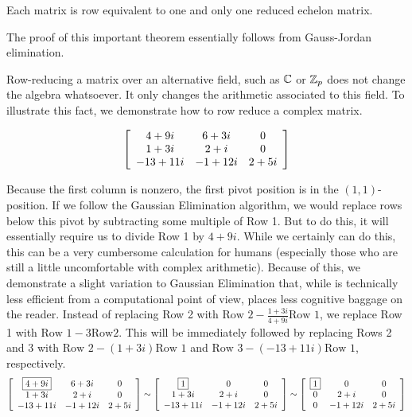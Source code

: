 \begin{Thm} Each matrix is row equivalent to one and only one reduced echelon matrix.
\end{Thm}\vs

The proof of this important theorem essentially follows from Gauss-Jordan elimination.

\begin{Exam} \begin{multicols}{2} %
Row-reducing a matrix over an alternative field, such as $\C$ or $\Z_p$ does not change the algebra whatsoever. It only changes the arithmetic associated to this field. To illustrate this fact, we demonstrate how to row reduce a complex matrix.

\[\mtx{ccc}{4+9i & 6+3i & 0 \\ 1+3i & 2+i & 0\\ -13+11i & -1+12i & 2+5i}\]
\end{multicols}

Because the first column is nonzero, the first pivot position is in the $(1,1)$-position. If we follow the Gaussian Elimination algorithm, we would replace rows below this pivot by subtracting some multiple of Row 1. But to do this, it will essentially require us to divide Row 1 by $4+9i$. While we certainly can do this, this can be a very cumbersome calculation for humans (especially those who are still a little uncomfortable with complex arithmetic). Because of this, we demonstrate a slight variation to Gaussian Elimination that, while is technically less efficient from a computational point of view, places less cognitive baggage on the reader. Instead of replacing Row 2 with $\text{Row 2} - \frac{1+3i}{4+9i}\text{Row 1}$, we replace Row 1 with $\text{Row 1} - 3\text{Row} 2$. This will be immediately followed by replacing Rows 2 and 3 with $\text{Row 2} - (1+3i)\text{Row 1}$ and $\text{Row 3} - (-13+11i)\text{Row 1}$, respectively.
\[\mtx{ccc}{\fbox{$4+9i$} & 6+3i & 0 \\ 1+3i & 2+i & 0\\ -13+11i & -1+12i & 2+5i} \sim \mtx{ccc}{\fbox{$1$} & 0 & 0 \\ 1+3i & 2+i & 0\\ -13+11i & -1+12i & 2+5i} \sim \mtx{ccc}{\fbox{$1$} & 0 & 0 \\ 0 & 2+i & 0\\ 0 & -1+12i & 2+5i}\]


\end{Exam}
